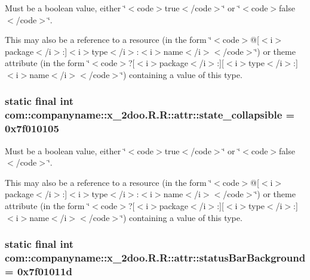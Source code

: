 Must be a boolean value, either \char`\"{}$<$code$>$true$<$/code$>$\char`\"{} or \char`\"{}$<$code$>$false$<$/code$>$\char`\"{}. 

This may also be a reference to a resource (in the form \char`\"{}$<$code$>$@\mbox{[}$<$i$>$package$<$/i$>$:\mbox{]}$<$i$>$type$<$/i$>$:$<$i$>$name$<$/i$>$$<$/code$>$\char`\"{}) or theme attribute (in the form \char`\"{}$<$code$>$?\mbox{[}$<$i$>$package$<$/i$>$:\mbox{]}\mbox{[}$<$i$>$type$<$/i$>$:\mbox{]}$<$i$>$name$<$/i$>$$<$/code$>$\char`\"{}) containing a value of this type. \hypertarget{classcom_1_1companyname_1_1x__2doo_1_1_r_1_1attr_cd9a413427cd311b68a50782bf2b9426}{
\subsubsection[{state\_\-collapsible}]{\setlength{\rightskip}{0pt plus 5cm}static final int com::companyname::x\_\-2doo.R.R::attr::state\_\-collapsible = 0x7f010105}}
\label{classcom_1_1companyname_1_1x__2doo_1_1_r_1_1attr_cd9a413427cd311b68a50782bf2b9426}


Must be a boolean value, either \char`\"{}$<$code$>$true$<$/code$>$\char`\"{} or \char`\"{}$<$code$>$false$<$/code$>$\char`\"{}. 

This may also be a reference to a resource (in the form \char`\"{}$<$code$>$@\mbox{[}$<$i$>$package$<$/i$>$:\mbox{]}$<$i$>$type$<$/i$>$:$<$i$>$name$<$/i$>$$<$/code$>$\char`\"{}) or theme attribute (in the form \char`\"{}$<$code$>$?\mbox{[}$<$i$>$package$<$/i$>$:\mbox{]}\mbox{[}$<$i$>$type$<$/i$>$:\mbox{]}$<$i$>$name$<$/i$>$$<$/code$>$\char`\"{}) containing a value of this type. \hypertarget{classcom_1_1companyname_1_1x__2doo_1_1_r_1_1attr_960b032980954641be5fc38946339385}{
\subsubsection[{statusBarBackground}]{\setlength{\rightskip}{0pt plus 5cm}static final int com::companyname::x\_\-2doo.R.R::attr::statusBarBackground = 0x7f01011d}}
\label{classcom_1_1companyname_1_1x__2doo_1_1_r_1_1attr_960b032980954641be5fc38946339385}


